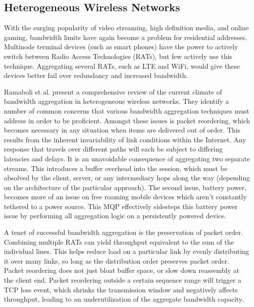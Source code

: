 \documentclass[12pt]{article}
\begin{document}
\subsection{Heterogeneous Wireless Networks}

	With the surging popularity of video streaming, high definition media, and online gaming, bandwidth limits have again become a problem for residential addresses. Multinode terminal devices (such as smart phones) have the power to actively switch between Radio Access Technologies (RATs), but few actively use this technique. Aggregating several RATs, such as LTE and WiFi, would give these devices better fail over redundancy and increased bandwidth.

	Ramaboli et al. present a comprehensive review of the current climate of bandwidth aggregation in heterogeneous wireless networks\cite{Ramaboli20121674}. They identify a number of common concerns that various bandwidth aggregation techniques must address in order to be proficient. Amongst these issues is packet reordering, which becomes necessary in any situation when items are delivered out of order. This results from the inherent invariability of link conditions within the Internet. Any response that travels over different paths will each be subject to differing latencies and delays. It is an unavoidable consequence of aggregating two separate streams. This introduces a buffer overhead into the session, which must be absolved by the client, server, or any intermediary hops along the way (depending on the architecture of the particular approach). The second issue, battery power, becomes more of an issue on free roaming mobile devices which aren't constantly tethered to a power source. This MQP effectively sidesteps this battery power issue by performing all aggregation logic on a persistently powered device.

	A tenet of successful bandwidth aggregation is the preservation of packet order. Combining multiple RATs can yield throughput equivalent to the sum of the individual lines. This helps reduce load on a particular link by evenly distributing it over many links, so long as the distribution order preserves packet order. Packet reordering does not just bloat buffer space, or slow down reassembly at the client end. Packet reordering outside a certain sequence range will trigger a TCP loss event, which shrinks the transmission window and negatively affects throughput, leading to an underutilization of the aggregate bandwidth capacity\cite{Ramaboli20121674}.
\end{document}
